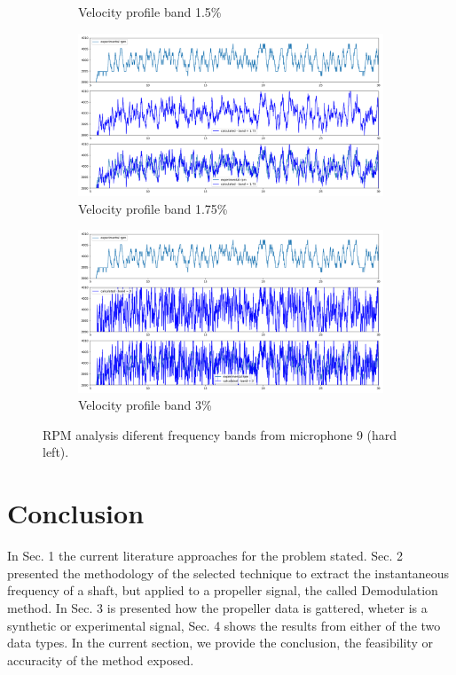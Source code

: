 \documentclass[10pt,fleqn,a4paper,twoside]{article}
\begin{document}
\begin{figure}
\begin{subfigure}{0.4\textwidth}
            \caption{Velocity profile band 1.5\%}
            \label{fig:sixth}
        \end{subfigure}
        \centering
        \hfill
        \begin{subfigure}{0.4\textwidth}
            \includegraphics[width=\textwidth]{Figures/rpm_analysis_mic8_band_1.75.png}
            \caption{Velocity profile band 1.75\%}
            \label{fig:seventh}
        \end{subfigure}
        \centering
        \hfill 
        \begin{subfigure}{0.4\textwidth}
            \includegraphics[width=\textwidth]{Figures/rpm_analysis_mic8_band_3.png}
            \caption{Velocity profile band 3\%}
            \label{fig:eigth}
        \end{subfigure}
                
        \caption{RPM analysis diferent frequency bands from microphone 9 (hard left).}
        \label{fig:figures}
        \end{figure}
\section{Conclusion}
In Sec. 1 the current literature approaches for the problem stated. Sec. 2 presented the methodology of the selected technique to extract the instantaneous frequency of a shaft, but applied to a propeller signal, the called Demodulation method. In Sec. 3 is presented how the propeller data is gattered, wheter is a synthetic or experimental signal, Sec. 4 shows the results from either of the two data types. In the current section, we provide the conclusion, the feasibility or accuracity of the method exposed.
\end{document}
